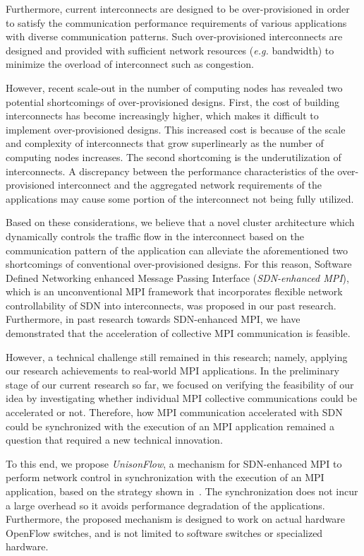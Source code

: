 Furthermore, current interconnects are designed to be over-provisioned
in order to satisfy the communication performance requirements of
various applications with diverse communication patterns. Such
over-provisioned interconnects are designed and provided with sufficient
network resources (\emph{e.g.} bandwidth) to minimize the overload of
interconnect such as congestion.

However, recent scale-out in the number of computing nodes has revealed
two potential shortcomings of over-provisioned designs. First, the cost
of building interconnects has become increasingly higher, which makes it
difficult to implement over-provisioned designs. This increased cost is
because of the scale and complexity of interconnects that grow
superlinearly as the number of computing nodes increases. The second
shortcoming is the underutilization of interconnects. A discrepancy
between the performance characteristics of the over-provisioned
interconnect and the aggregated network requirements of the applications
may cause some portion of the interconnect not being fully utilized.

Based on these considerations, we believe that a novel cluster
architecture which dynamically controls the traffic flow in the
interconnect based on the communication pattern of the application can
alleviate the aforementioned two shortcomings of conventional
over-provisioned designs. For this reason, Software Defined Networking
enhanced Message Passing Interface (\emph{SDN-enhanced MPI}), which is
an unconventional MPI framework that incorporates flexible network
controllability of SDN into interconnects, was proposed in our past
research. Furthermore, in past research towards SDN-enhanced MPI, we
have demonstrated that the acceleration of collective MPI communication
is feasible.

However, a technical challenge still remained in this research; namely,
applying our research achievements to real-world MPI applications. In
the preliminary stage of our current research so far, we focused on
verifying the feasibility of our idea by investigating whether
individual MPI collective communications could be accelerated or not.
Therefore, how MPI communication accelerated with SDN could be
synchronized with the execution of an MPI application remained a
question that required a new technical innovation.

To this end, we propose \emph{UnisonFlow}, a mechanism for SDN-enhanced
MPI to perform network control in synchronization with the execution of
an MPI application, based on the strategy shown
in~\autocite{Takahashi2015}. The synchronization does not incur a large
overhead so it avoids performance degradation of the applications.
Furthermore, the proposed mechanism is designed to work on actual
hardware OpenFlow switches, and is not limited to software switches or
specialized hardware.

